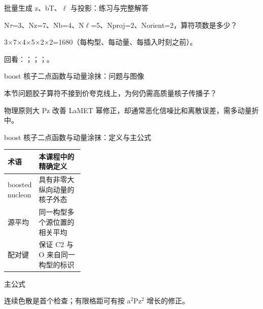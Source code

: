 \begin{frame}[t]{批量生成 z、bT、\ensuremath{\ell} 与投影：练习与完整解答}
\footnotesize
\begin{block}{}N\ensuremath{\tau}=3、Nz=7、Nb=4、N\ensuremath{\ell}=5、Nproj=2、Norient=2，算符项数是多少？\end{block}
\begin{exampleblock}{}3\ensuremath{\times}7\ensuremath{\times}4\ensuremath{\times}5\ensuremath{\times}2\ensuremath{\times}2=1680（每构型、每动量、每插入时刻之前）。\end{exampleblock}
\vfill
\scriptsize 回看：；；；。
\end{frame}

\begin{frame}[t]{boost 核子二点函数与动量涂抹：问题与图像}
\footnotesize
\begin{block}{本节问题}胶子算符不接到价夸克线上，为何仍需高质量核子传播子？\end{block}
\begin{block}{物理原则}\quad 大 Pz 改善 LaMET 幂修正，却通常恶化信噪比和离散误差，需多动量折中。\end{block}
\end{frame}

\begin{frame}[t]{boost 核子二点函数与动量涂抹：定义与主公式}
\footnotesize\begin{tabularx}{\linewidth}{p{0.30\linewidth}Y}
\toprule 术语 & 本课程中的精确定义\\\midrule
{} boosted nucleon & 具有非零大纵向动量的核子外态\\
 源平均 & 同一构型多个源位置的相关平均\\
 配对键 & 保证 C2 与 O 来自同一构型的标识\\
\bottomrule\end{tabularx}\vspace{0.15cm}
\begin{block}{ 主公式}\centering{}\end{block}
连续色散是首个检查；有限格距可有按 a\ensuremath{^{2}}Pz\ensuremath{^{2}} 增长的修正。
\end{frame}

